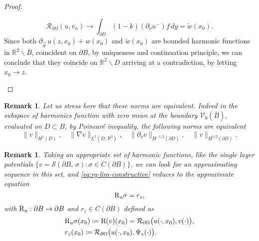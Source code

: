 \documentclass[10pt, a4paper, twoside, openright]{book}
\theoremstyle{definition}
\theoremstyle{plain}
\theoremstyle{plain}
\theoremstyle{plain}
\theoremstyle{plain}
\newtheorem{remark}[subsection]{Remark}
\theoremstyle{plain}
\theoremstyle{plain}
\theoremstyle{plain}
\theoremstyle{plain}
\begin{document}
\begin{proof}
\begin{enumerate}
  \begin{equation}
   \mathcal{R}_{\partial \Omega}(u,v_n) \to \int_{\partial D}(1-k)(\partial_\nu u^- )f\,dy = \widetilde{w}(x_0).
  \end{equation}
 Since both $\partial_{\vec{d}}\,u(z,x_0) + w(x_0)$ and $\widetilde{w}(x_0)$ are bounded harmonic functions
 in $\mathbb{R}^2\backslash\overline{B}$, coincident on $\partial B$, by uniqueness
 and continuation principle, we can conclude that they coincide on $\mathbb{R}^2\backslash D$ arriving at a contradiction, by letting $x_0\to z$.
 \end{enumerate}
\end{proof}
\begin{remark}
 Let us stress here that these norms are equivalent. Indeed in the subspace of harmonics function with zero mean at the boundary $\mathcal{V}_0(\overline{B})$, evaluated on $D\subset B$, by Poincaré inequality, the following norms are equivalent
 \begin{equation}
  \|v\|_{H^1(D)},\quad\|\nabla v\|_{L^2(D;\,\mathbb{R}^2)},\quad \|\partial_\nu v\|_{H^{-1/2}(\partial D)},\quad \|v\|_{H^{1/2}(\partial D)}.
 \end{equation}
\end{remark}
\begin{remark}
 Taking an appropriate set of harmonic functions, like the single layer potentials $\{v=\mathcal{S}(\partial B,\,\sigma): \sigma \in C(\partial B)\}$, we can look for an approximating sequence in this set, 
 and \eqref{eq:rg-lim-constructive} reduces to the approximate equation
 \begin{equation}
  \textup{R}_u \sigma = r_z,\label{eq:rg-approximate-eq}
 \end{equation}
with $\textup{R}_u:\partial B\to \partial B$ and $r_z\in C(\partial B)$ defined as
\begin{align}
 &\textup{R}_u\sigma(x_0) \coloneqq  \textup{R}(v)(x_0)=\mathcal{R}_{\partial\Omega}\bigl(u(\cdot,x_0),v(\cdot)\bigr), \\
 & r_z(x_0)\coloneqq \mathcal{R}_{\partial\Omega}\bigl(u(\cdot,x_0),\Psi_z(\cdot)\bigr).
\end{align}
\end{remark}
\end{document}
